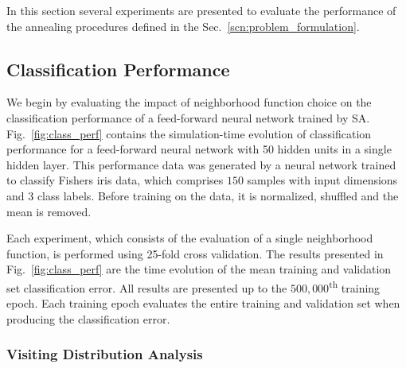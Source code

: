 \documentclass[10pt,journal,cspaper,compsoc]{IEEEtran}
\begin{document}
In this section several experiments are presented to evaluate the performance of the annealing procedures defined in the Sec.~\ref{scn:problem_formulation}.


\subsection{Classification Performance}

We begin by evaluating the impact of neighborhood function choice on the classification performance of a feed-forward neural network trained by SA. Fig.~\ref{fig:class_perf} contains the simulation-time evolution of classification performance for a feed-forward neural network with 50 hidden units in a single hidden layer. This performance data was generated by a neural network trained to classify Fishers iris data, which comprises $150$ samples with input dimensions and $3$ class labels. Before training on the data, it is normalized, shuffled and the mean is removed.

Each experiment, which consists of the evaluation of a single neighborhood function, is performed using 25-fold cross validation. The results presented in Fig.~\ref{fig:class_perf} are the time evolution of the mean training and validation set classification error. All results are presented up to the $500,000$\textsuperscript{th} training epoch. Each training epoch evaluates the entire training and validation set when producing the classification error.


\subsubsection{Visiting Distribution Analysis}
\end{document}
